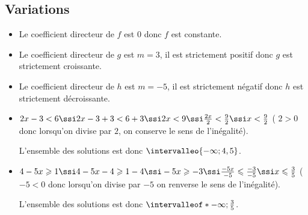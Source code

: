 \subsection{Variations}
%
%
%
\begin{exr}
\begin{itemize}
\item Le coefficient directeur de $f$ est $0$ donc $f$ est constante.
\item Le coefficient directeur de $g$ est $m=3$, il est strictement positif  donc $g$ est strictement croissante.
\item Le coefficient directeur de $h$ est $m=-5$, il est strictement négatif  donc $h$ est strictement décroissante.
\end{itemize}
\end{exr}
%
%
%
\begin{exr}
    \begin{itemize}
    \item $2x-3<6 \ssi 2x-3+3<6+3 \ssi 2x<9 \ssi \frac{2x}{2}<\frac{9}{2} \ssi x<\frac92$ ( $2>0$ donc lorsqu'on divise par $2$, on conserve le sens de l'inégalité).
    
    L'ensemble des solutions est donc $\intervalleo{-\infty;4,5}$.
    \item $4-5x\geqslant 1 \ssi 4-5x-4\geqslant 1-4\ssi -5x \geqslant -3 \ssi \frac{-5x}{-5}\leqslant \frac{-3}{-5}\ssi x\leqslant \frac35$ ($-5<0$ donc lorsqu'on divise par $-5$ on renverse le sens de l'inégalité).
    
    L'ensemble des solutions est donc $\intervalleof*{-\infty;\frac35}$.
    \end{itemize}
\end{exr}
%
%
%
